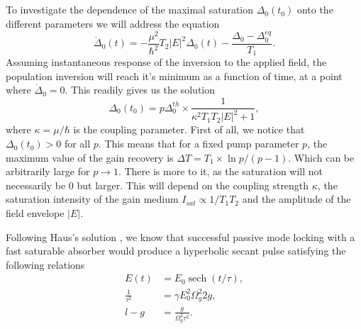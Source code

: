 \documentclass[preprint,secnumarabic,amssymb, nobibnotes, aip, prd]{revtex4-1}
\DeclareMathOperator{\sech}{sech}
\begin{document}
\subsection{}
To investigate the dependence of the maximal saturation $\Delta_0(t_0)$ onto the different parameters we will address the equation
\begin{equation}
\label{eq:inversion3}
\dot\Delta_0(t) = -\frac{\mu^2}{\hbar^2}T_{2} |E|^2\Delta_0(t) -\frac{\Delta_0-\Delta_0^{eq}}{T_1}.
\end{equation}
Assuming instantaneous response of the inversion to the applied field, the population inversion will reach it's minimum as a function of time, at a point where $\dot\Delta_0 = 0$. This readily gives us the solution
\begin{equation}
\label{eq:saturation}
\Delta_0(t_0) = p\Delta_0^{th}\times \frac{1}{\kappa^2T_1T_2|E|^2+1},
\end{equation} 
where $\kappa = \mu/\hbar$ is the coupling parameter. First of all, we notice that $\Delta_0(t_0) >0$ for all $p$. This means that for a fixed pump parameter $p$, the maximum value of the gain recovery is $\Delta T= T_1\times\ln p/(p-1)$. Which can be arbitrarily large for $p\to 1$. There is more to it, as the saturation will not necessarily be 0 but larger. This will depend on the coupling strength $\kappa$, the saturation intensity of the gain medium $I_{sat}\propto 1/T_1T_2$ and the amplitude of the field envelope $|E|$.

Following Haus's solution \cite{haus2000mode}, we know that successful passive mode locking with a fast saturable absorber would produce a hyperbolic secant pulse satisfying the following relations
\begin{align}
E(t) &= E_0 \sech(t/\tau) , \\
\frac{1}{\tau^2} &= {\gamma E_0^2\Omega_g^2}{2g} , \\
l-g &= \frac{g}{\Omega_g^2\tau^2}.
\end{align}


\end{document}
